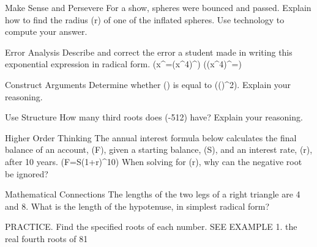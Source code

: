 \documentclass{article}
\newenvironment{practice}[2]{}{}        %
\newcommand{\answer}[1]{}               %
\newcommand{\placeholder}[2]{}          %
\newcommand{\te}[1]{}                   %
\begin{document}
\begin{practice}{19}{2}
Make Sense and Persevere For a show, spheres were bounced and passed. Explain how to find the radius (r) of one of the inflated spheres. Use technology to compute your answer.
\placeholder{photo}{Show audience passing large orange and yellow inflated spheres. Callout: Volume of a sphere is (4,186\frac23\text{ in.}^3).}
\answer{Use the volume formula to solve for (r). Divide (4,186\frac23) by (\frac43) and the result by (\pi\approx3.14). This leaves (1,000\approx r^3). The cube root of 1,000 is 10, so the radius is approximately 10 in.}
\end{practice}
\begin{practice}{20}{2}
Error Analysis Describe and correct the error a student made in writing this exponential expression in radical form.
(x^{}=(x^4)^{})
((x^4)^{}=)
\te{A red X marks the student's work.}
\answer{((x^4)^{\frac13}) is correct, but the denominator of the fraction, 3, is the index of the radical: (\sqrt[3]{x^4}).}
\end{practice}
\begin{practice}{21}{2}
Construct Arguments Determine whether () is equal to (()^2). Explain your reasoning.
\answer{Yes, they are equal; (\sqrt[3]{x^2}) and ((\sqrt[3]{x})^2) can both be written as (x^{\frac23}), so they must be equal.}
\end{practice}
\begin{practice}{22}{2}
Use Structure How many third roots does (-512) have? Explain your reasoning.
\answer{1; only one real number, (-8), times itself 3 times equals (-512).}
\end{practice}
\begin{practice}{23}{2}
Higher Order Thinking The annual interest formula below calculates the final balance of an account, (F), given a starting balance, (S), and an interest rate, (r), after 10 years.
(F=S(1+r)^{10})
When solving for (r), why can the negative root be ignored?
\answer{The negative root can be ignored because the interest rate must be a positive number.}
\end{practice}
\begin{practice}{24}{2}
Mathematical Connections The lengths of the two legs of a right triangle are 4 and 8. What is the length of the hypotenuse, in simplest radical form?
\answer{(4\sqrt5)}
\end{practice}
\begin{practice}{25}{1}
PRACTICE. Find the specified roots of each number. SEE EXAMPLE 1.
the real fourth roots of 81
\answer{(\pm3)}
\end{practice}
\end{document}
